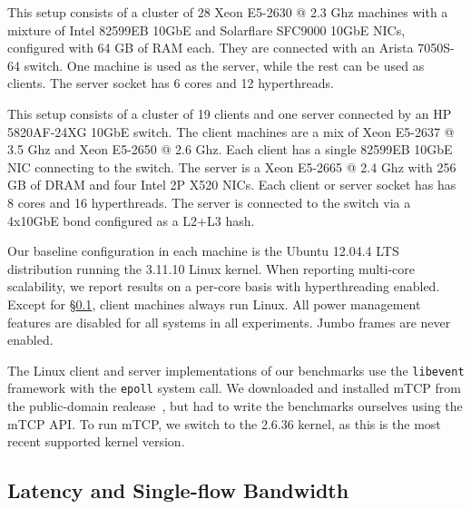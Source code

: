 
 
 This setup consists of a
cluster of 28 Xeon E5-2630 @ 2.3 Ghz machines with a mixture of
Intel 82599EB 10GbE and Solarflare SFC9000 10GbE NICs, configured
with 64 GB of RAM each. They are connected with an Arista 7050S-64
switch. One machine is used as the server, while the rest can be used
as clients. The server socket has 6 cores and 12 hyperthreads.

 This setup consists of a cluster of 19
clients and one server connected by an HP 5820AF-24XG 10GbE switch.
The client machines are a mix of Xeon E5-2637 @ 3.5 Ghz and Xeon
E5-2650 @ 2.6 Ghz.  Each client has a single 82599EB 10GbE NIC
connecting to the switch.  The server is a Xeon E5-2665 @ 2.4 Ghz with
256 GB of DRAM and four Intel 2P X520 NICs.  Each client or server
socket has has 8 cores and 16 hyperthreads.  The server is connected
to the switch via a 4x10GbE bond configured as a L2+L3 hash.

 Our baseline configuration in each
machine is the Ubuntu 12.04.4 LTS distribution running the 3.11.10
Linux kernel.  When reporting multi-core scalability, we report
results on a per-core basis with hyperthreading enabled.  Except for
\S\ref{sec:eval:netpipe}, client machines always run Linux. All power
management features are disabled for all systems in all
experiments. Jumbo frames are never enabled.




%



The Linux client and server implementations of our benchmarks use the
\texttt{libevent} framework with the \texttt{epoll} system call.  We
downloaded and installed mTCP from the public-domain
realease~\cite{url:mtcp}, but had to write the benchmarks ourselves
using the mTCP API.  To run mTCP, we switch to the 2.6.36 kernel, as
this is the most recent supported kernel version.

\subsection{Latency and Single-flow Bandwidth}
\label{sec:eval:netpipe}

